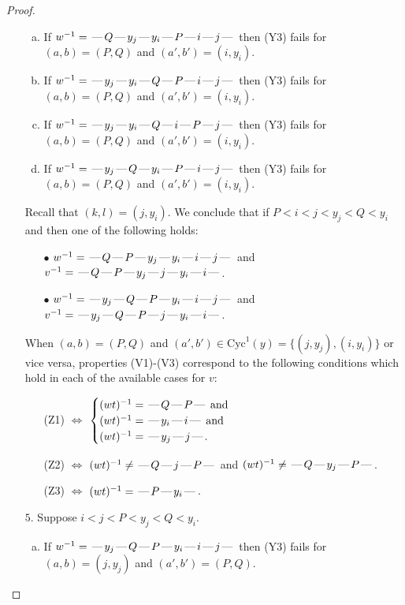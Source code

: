 \documentclass[10pt]{article}
\theoremstyle{definition}
\theoremstyle{definition}
\def\dash{\text{\hspace{0.5mm}---\hspace{0.5mm}}}
\def\Cyc{\mathrm{Cyc}}
\begin{document}
\begin{proof}
\begin{enumerate}
\begin{enumerate}[(a)]
\item If $w^{-1} = \dash Q\dash y_j\dash y_i\dash P\dash i\dash j\dash $ then (Y3) fails for $(a,b)=(P,Q)$ and $(a',b')=(i,y_i)$.
\item If $w^{-1} = \dash y_j\dash y_i\dash Q\dash P\dash i\dash j\dash $ then (Y3) fails for $(a,b)=(P,Q)$ and $(a',b')=(i,y_i)$.
\item If $w^{-1} = \dash y_j\dash y_i\dash Q\dash i\dash P\dash j\dash $ then (Y3) fails for $(a,b)=(P,Q)$ and $(a',b')=(i,y_i)$.
\item If $w^{-1} = \dash y_j\dash Q\dash y_i\dash P\dash i\dash j\dash $ then (Y3) fails for $(a,b)=(P,Q)$ and $(a',b')=(i,y_i)$.
\end{enumerate}
Recall that $(k,l) = (j,y_i)$.
We conclude that if $P < i < j < y_j < Q < y_i$ and then one of the following holds:
\begin{enumerate}
\item[$\bullet$] $w^{-1} = \dash Q\dash P\dash y_j\dash y_i\dash i\dash j\dash $ and $v^{-1} = \dash Q\dash P\dash y_j\dash j\dash y_i\dash i\dash $.
\item[$\bullet$] $w^{-1} = \dash y_j\dash Q\dash P\dash y_i\dash i\dash j\dash $ and $v^{-1} = \dash y_j\dash Q\dash P\dash j\dash y_i\dash i\dash $.
\end{enumerate}
When $(a,b)= (P,Q)$ and $(a',b')\in \Cyc^1(y)=\{(j,y_j),(i,y_i)\}$ or vice versa,
properties (V1)-(V3) correspond to the following conditions which hold in
each of the available cases for $v$:
\begin{enumerate}
\item[](Z1) $\Leftrightarrow$ $\begin{cases}\text{$(wt)^{-1} = \dash Q \dash P \dash$}\text{ and }\\
\text{$(wt)^{-1} = \dash y_i \dash i \dash$}\text{ and }\\
\text{$(wt)^{-1} = \dash y_j \dash j \dash$}.\end{cases}$
\item[](Z2) $\Leftrightarrow$ $(wt)^{-1} \neq \dash Q \dash j \dash P \dash$ and $(wt)^{-1}\neq \dash Q \dash y_j \dash P \dash$.
\item[](Z3) $\Leftrightarrow$ $(wt)^{-1} = \dash P \dash y_i \dash$.
\end{enumerate}
\item[$5$.] Suppose $i < j < P < y_j < Q < y_i$.
\begin{enumerate}[(a)]
\item If $w^{-1} = \dash y_j\dash Q\dash P\dash y_i\dash i\dash j\dash $ then (Y3) fails for $(a,b)=(j,y_j)$ and $(a',b')=(P,Q)$.

\end{enumerate}
\end{enumerate}
\end{proof}
\end{document}
